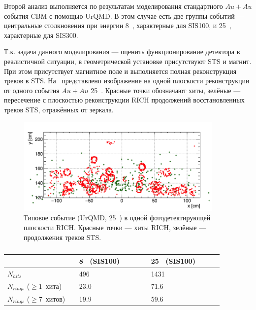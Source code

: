 \begin{figure}[H]
\begin{minipage}[t]{0.495\textwidth}
\end{minipage}
\caption{}
\label{fig:RICHchar3}
\end{figure}



Второй анализ выполняется по результатам моделирования стандартного $Au+Au$ события CBM с помощью UrQMD. В этом случае есть две группы событий --- центральные столкновения при энергии 8~\GeVperNucl{}, характерные для SIS100, и 25~\GeVperNucl{}, характерные для SIS300.

Т.к. задача данного моделирования --- оценить функционирование детектора в реалистичной ситуации, в геометрической установке присутствуют STS и магнит. При этом присутствует магнитное поле и выполняется полная реконструкция треков в STS. На~ представлено изображение на одной плоскости реконструкции от одного события $Au+Au$ 25~\GeVperNucl{}. Красные точки обозначают хиты, зелёные --- пересечение с плоскостью реконструкции RICH продолжений восстановленных треков STS, отражённых от зеркала.

\begin{figure}[H]
\includegraphics[width=0.9\textwidth]{pictures/CbmRichOneEvent.png}
\caption{Типовое событие (UrQMD, 25~\GeVperNucl{}) в одной фотодетектирующей плоскости RICH. Красные точки --- хиты RICH, зелёные --- продолжения треков STS.}
\label{fig:CbmRichOneEvent}
\end{figure}


\begin{table}[H]
\caption{}
\label{tabl:RICHAuAuChar}
\begin{tabular}{ | p{0.3\linewidth} | p{0.3\linewidth} | p{0.3\linewidth} | }
\hline
& 8~\GeVperNucl{} (SIS100) & 25~\GeVperNucl{} (SIS100) \\
\hline
$N_{hits}$ & 496 & 1431 \\
\hline
$N_{rings}$ ($\geq1$~хита) & 23.0 & 71.6 \\
\hline
$N_{rings}$ ($\geq7$~хитов) & 19.9 & 59.6 \\
\hline
\end{tabular}
\end{table}

